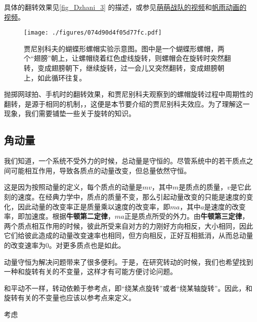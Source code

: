 具体的翻转效果见\autoref{fig_Dzhani_3} 的描述，或参见\href{https://www.bilibili.com/video/BV1jy4y1Y7CU/?share_source=copy_web&vd_source=5d336c88ab0583d823dccd3a9651b27b}{萌萌战队的视频}和\href{https://www.bilibili.com/video/BV12K411S7Gc/?spm_id_from=333.337.search-card.all.click&vd_source=0ae31f148e26bb548391e861d5f13610}{帆雨动画的视频}。


\begin{figure}[ht]
\centering
\texttt{[image: ./figures/074d90d4f05d77fc.pdf]}
\caption{贾尼别科夫的蝴蝶形螺帽实验示意图。图中是一个蝴蝶形螺帽，两个“翅膀”朝上，让螺帽绕着红色虚线旋转，则螺帽会在旋转时突然翻转，变成翅膀朝下，继续旋转，过一会儿又突然翻转，变成翅膀朝上，如此循环往复。} \label{fig_Dzhani_3}
\end{figure}



抛掷网球拍、手机时的翻转效果，和贾尼别科夫观察到的螺帽旋转过程中周期性的翻转，是源于相同的机制，，这便是本节要介绍的贾尼别科夫效应。为了理解这一现象，我们需要铺垫一些关于旋转的知识。





\subsection{角动量}


我们知道，一个系统不受外力的时候，总动量是守恒的。尽管系统中的若干质点之间可能相互作用，导致各质点的动量改变，但总量依然守恒。

这是因为按照动量的定义，每个质点的动量是$mv$，其中$m$是质点的质量，$v$是它此刻的速度。在经典力学中，质点的质量不变，那么引起动量改变的只能是速度的变化，因此动量的改变率正是质量乘以速度的改变率，即$ma$，其中$a$是速度的改变率，即加速度。根据\textbf{牛顿第二定律}，$ma$正是质点所受的外力。由\textbf{牛顿第三定律}，两个质点相互作用的时候，彼此所受来自对方的力刚好方向相反，大小相同，因此它们给彼此造成的动量改变速率也相同，但方向相反，正好互相抵消，从而总动量的改变速率为$0$。对更多质点也是如此。


动量守恒为解决问题带来了很多便利。于是，在研究转动的时候，我们也希望找到一种和旋转有关的不变量，这样才有可能方便讨论问题。


和平动不一样，转动依赖于参考点，即“绕某点旋转”或者“绕某轴旋转”。因此，和旋转有关的不变量也应该以参考点来定义。


考虑






















